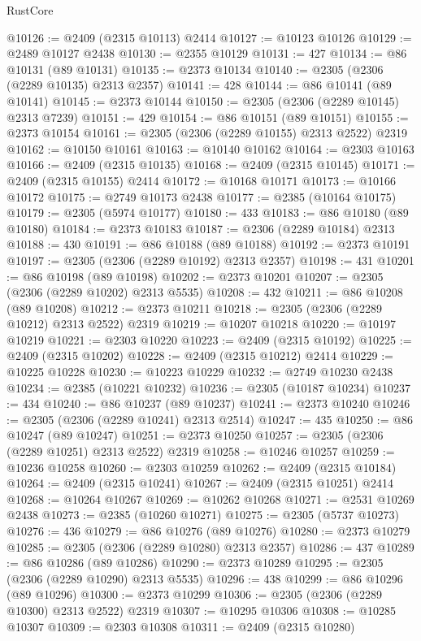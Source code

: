 \begin{lexlean}{RustCore}
\begin{coremodule}
@10126 := @2409 (@2315 @10113) @2414
@10127 := @10123 @10126
@10129 := @2489 @10127 @2438
@10130 := @2355 @10129
@10131 := 427
@10134 := @86 @10131 (@89 @10131)
@10135 := @2373 @10134
@10140 := @2305 (@2306 (@2289 @10135) @2313 @2357)
@10141 := 428
@10144 := @86 @10141 (@89 @10141)
@10145 := @2373 @10144
@10150 := @2305 (@2306 (@2289 @10145) @2313 @7239)
@10151 := 429
@10154 := @86 @10151 (@89 @10151)
@10155 := @2373 @10154
@10161 := @2305 (@2306 (@2289 @10155) @2313 @2522) @2319
@10162 := @10150 @10161
@10163 := @10140 @10162
@10164 := @2303 @10163
@10166 := @2409 (@2315 @10135)
@10168 := @2409 (@2315 @10145)
@10171 := @2409 (@2315 @10155) @2414
@10172 := @10168 @10171
@10173 := @10166 @10172
@10175 := @2749 @10173 @2438
@10177 := @2385 (@10164 @10175)
@10179 := @2305 (@5974 @10177)
@10180 := 433
@10183 := @86 @10180 (@89 @10180)
@10184 := @2373 @10183
@10187 := @2306 (@2289 @10184) @2313
@10188 := 430
@10191 := @86 @10188 (@89 @10188)
@10192 := @2373 @10191
@10197 := @2305 (@2306 (@2289 @10192) @2313 @2357)
@10198 := 431
@10201 := @86 @10198 (@89 @10198)
@10202 := @2373 @10201
@10207 := @2305 (@2306 (@2289 @10202) @2313 @5535)
@10208 := 432
@10211 := @86 @10208 (@89 @10208)
@10212 := @2373 @10211
@10218 := @2305 (@2306 (@2289 @10212) @2313 @2522) @2319
@10219 := @10207 @10218
@10220 := @10197 @10219
@10221 := @2303 @10220
@10223 := @2409 (@2315 @10192)
@10225 := @2409 (@2315 @10202)
@10228 := @2409 (@2315 @10212) @2414
@10229 := @10225 @10228
@10230 := @10223 @10229
@10232 := @2749 @10230 @2438
@10234 := @2385 (@10221 @10232)
@10236 := @2305 (@10187 @10234)
@10237 := 434
@10240 := @86 @10237 (@89 @10237)
@10241 := @2373 @10240
@10246 := @2305 (@2306 (@2289 @10241) @2313 @2514)
@10247 := 435
@10250 := @86 @10247 (@89 @10247)
@10251 := @2373 @10250
@10257 := @2305 (@2306 (@2289 @10251) @2313 @2522) @2319
@10258 := @10246 @10257
@10259 := @10236 @10258
@10260 := @2303 @10259
@10262 := @2409 (@2315 @10184)
@10264 := @2409 (@2315 @10241)
@10267 := @2409 (@2315 @10251) @2414
@10268 := @10264 @10267
@10269 := @10262 @10268
@10271 := @2531 @10269 @2438
@10273 := @2385 (@10260 @10271)
@10275 := @2305 (@5737 @10273)
@10276 := 436
@10279 := @86 @10276 (@89 @10276)
@10280 := @2373 @10279
@10285 := @2305 (@2306 (@2289 @10280) @2313 @2357)
@10286 := 437
@10289 := @86 @10286 (@89 @10286)
@10290 := @2373 @10289
@10295 := @2305 (@2306 (@2289 @10290) @2313 @5535)
@10296 := 438
@10299 := @86 @10296 (@89 @10296)
@10300 := @2373 @10299
@10306 := @2305 (@2306 (@2289 @10300) @2313 @2522) @2319
@10307 := @10295 @10306
@10308 := @10285 @10307
@10309 := @2303 @10308
@10311 := @2409 (@2315 @10280)

\end{coremodule}
\end{lexlean}
